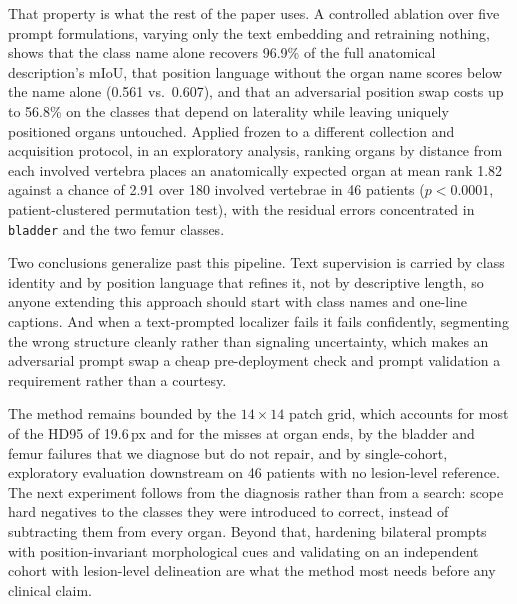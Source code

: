 \documentclass[10pt]{article}
\newcommand{\org}[1]{\texttt{#1}}
\begin{document}
That property is what the rest of the paper uses. A controlled ablation over five
prompt formulations, varying only the text embedding and retraining nothing,
shows that the class name alone recovers 96.9\% of the full anatomical
description's mIoU, that position language without the organ name scores below
the name alone (0.561 vs.\ 0.607), and that an adversarial position swap costs up
to 56.8\% on the classes that depend on laterality while leaving uniquely
positioned organs untouched. Applied frozen to a different collection and
acquisition protocol, in an exploratory analysis, ranking organs by distance
from each involved vertebra places an anatomically expected organ at mean rank
1.82 against a chance of 2.91 over 180 involved vertebrae in 46 patients
($p<0.0001$, patient-clustered permutation test), with the residual errors
concentrated in \org{bladder} and the two femur classes.

Two conclusions generalize past this pipeline. Text supervision is carried by
class identity and by position language that refines it, not by descriptive
length, so anyone extending this approach should start with class names and
one-line captions. And when a text-prompted localizer fails it fails confidently,
segmenting the wrong structure cleanly rather than signaling uncertainty, which
makes an adversarial prompt swap a cheap pre-deployment check and prompt
validation a requirement rather than a courtesy.

The method remains bounded by the $14\times14$ patch grid, which accounts for most
of the HD95 of 19.6\,px and for the misses at organ ends, by the bladder and femur
failures that we diagnose but do not repair, and by single-cohort, exploratory
evaluation downstream on 46 patients with no lesion-level reference. The next
experiment follows from the diagnosis rather than from a search: scope hard
negatives to the classes they were introduced to correct, instead of subtracting
them from every organ. Beyond that, hardening bilateral prompts with
position-invariant morphological cues and validating on an independent cohort
with lesion-level delineation are what the method most needs before any clinical
claim.

\end{document}
